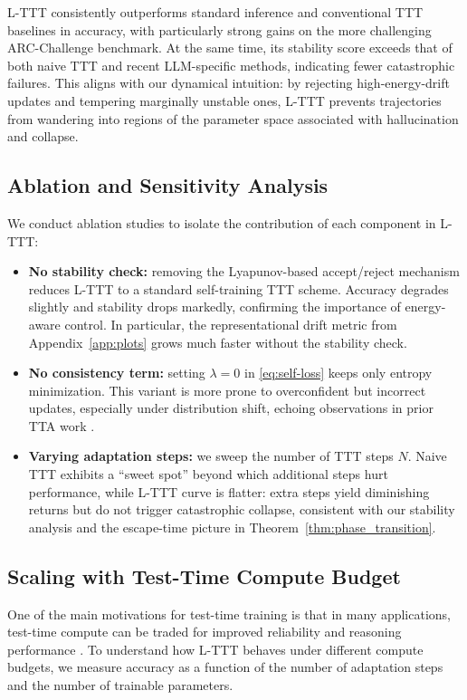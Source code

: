 \documentclass{article}
\theoremstyle{plain}
\theoremstyle{definition}
\theoremstyle{remark}
\begin{document}
L-TTT consistently outperforms standard inference and conventional TTT baselines in accuracy, with particularly strong gains on the more challenging ARC-Challenge benchmark. At the same time, its stability score exceeds that of both naive TTT and recent LLM-specific methods, indicating fewer catastrophic failures. This aligns with our dynamical intuition: by rejecting high-energy-drift updates and tempering marginally unstable ones, L-TTT prevents trajectories from wandering into regions of the parameter space associated with hallucination and collapse.

\subsection{Ablation and Sensitivity Analysis}

We conduct ablation studies to isolate the contribution of each component in L-TTT:

\begin{itemize}
    \item \textbf{No stability check:} removing the Lyapunov-based accept/reject mechanism reduces L-TTT to a standard self-training TTT scheme. Accuracy degrades slightly and stability drops markedly, confirming the importance of energy-aware control. In particular, the representational drift metric from Appendix~\ref{app:plots} grows much faster without the stability check.
    \item \textbf{No consistency term:} setting $\lambda=0$ in \eqref{eq:self-loss} keeps only entropy minimization. This variant is more prone to overconfident but incorrect updates, especially under distribution shift, echoing observations in prior TTA work \cite{zhang2024surveytta,chen2024understanding}.
    \item \textbf{Varying adaptation steps:} we sweep the number of TTT steps $N$. Naive TTT exhibits a ``sweet spot'' beyond which additional steps hurt performance, while L-TTT curve is flatter: extra steps yield diminishing returns but do not trigger catastrophic collapse, consistent with our stability analysis and the escape-time picture in Theorem~\ref{thm:phase_transition}.
\end{itemize}


\subsection{Scaling with Test-Time Compute Budget}

One of the main motivations for test-time training is that in many applications, test-time compute can be traded for improved reliability and reasoning performance \cite{snell2024scaling,ttcsurvey2025,ttcompute2025,deepseek2025}. To understand how L-TTT behaves under different compute budgets, we measure accuracy as a function of the number of adaptation steps and the number of trainable parameters.
\end{document}
